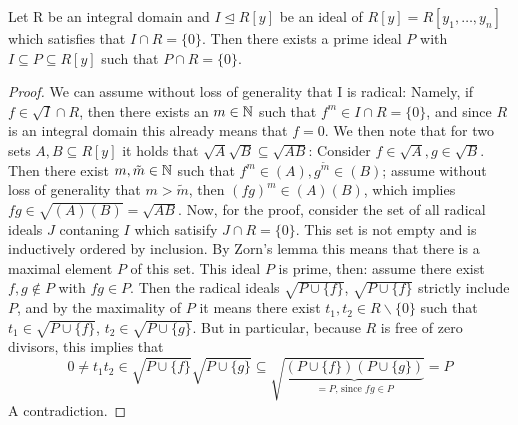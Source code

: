 \begin{lem}\label{primeoverp1}
Let R be an integral domain and $I \unlhd R[y]$ be an ideal of $R[y] = R[y_1,\ldots,y_n]$ which satisfies that $I \cap R = \{ 0 \}$.
Then there exists a prime ideal $P$ with $I \subseteq P \subseteq R[y] $ such that $P \cap R = \{0\}$.
\begin{proof}
We can assume without loss of generality that I is radical:
Namely, if $f \in \sqrt{I} \cap R$, then there exists an $m \in \mathbb{N}$ such that $f^m \in I \cap R = \{0\}$, and since $R$ is an integral domain this already means that $f = 0$.
We then note that for two sets $A,B \subseteq R[y]$ it holds that $\sqrt{A}\sqrt{B} \subseteq \sqrt{AB}$: Consider $f \in \sqrt{A}, g \in \sqrt{B}$. Then there exist $m, \tilde m \in \mathbb{N}$ such that $f^m \in (A), g^{\tilde m} \in (B)$;
 assume without loss of generality that $m > \tilde m$, then $(fg)^m \in (A)(B)$, which implies $fg \in \sqrt{(A)(B)} = \sqrt{AB}$.
Now, for the proof, consider the set of all radical ideals $J$ contaning $I$ which satisify $J \cap R = \{0\}$. This set is not empty and is inductively ordered by inclusion.
By Zorn's lemma this means that there is a maximal element $P$ of this set. This ideal $P$ is prime, then: assume there exist $f,g \notin P$ with $fg \in P$. 
Then the radical ideals $\sqrt{P \cup \{f\}}$, $\sqrt{P \cup \{f\}}$ strictly include $P$, and by the maximality of $P$ it means there exist $t_1, t_2 \in R\backslash\{0\}$ such that
$t_1 \in \sqrt{P \cup \{f\}}$, $t_2 \in \sqrt{P \cup \{g\}}$. But in particular, because $R$ is free of zero divisors, this implies that
 \[0 \neq t_1t_2 \in \sqrt{P \cup \{f\}}\sqrt{P \cup \{g\}} \subseteq \sqrt{ \underbrace{(P \cup \{f\})(P \cup \{g\})}_{=P\text{, since }fg \in P}} = P\]
A contradiction.
\end{proof}
\end{lem}



